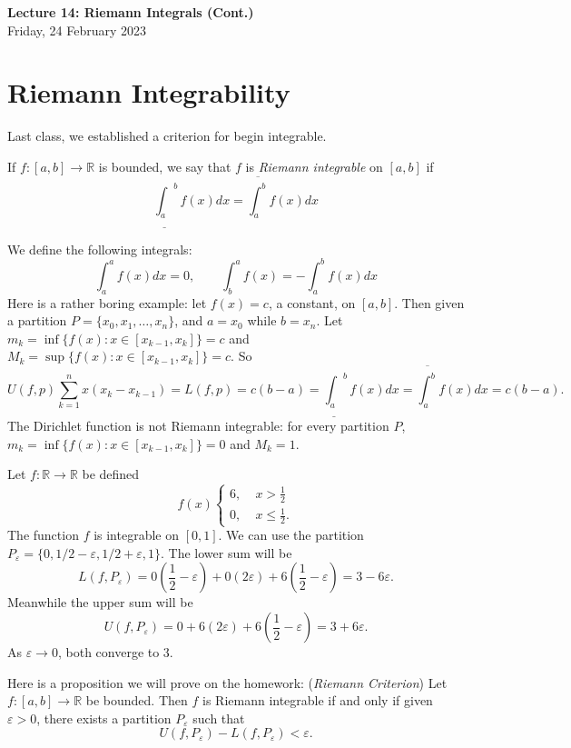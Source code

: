 \documentclass[11pt]{article}
\theoremstyle{definition}
\newcommand{\R}{\mathbb{R}}                      %
\begin{document}
\thispagestyle{empty}

\begin{center}
{\LARGE \bf Lecture 14: Riemann Integrals (Cont.)}\\
{\large Friday, 24 February 2023}\\

\end{center}

\section{Riemann Integrability}

Last class, we established a criterion for begin integrable.
\begin{mdframed}[backgroundcolor = blue!10]
\vspace{+0.2cm}
 If $f:[a,b]\to \R$ is bounded, we say that $f$ is \textit{Riemann integrable} on $[a,b]$ if 
$$
\underline{\int_a}^b f(x)dx =\overline{\int_a^b} f(x)dx
$$
\end{mdframed}
\note We define the following integrals:
$$
\int_a^a f(x)dx=0,\qquad\int_b^a f(x)=-\int_a^b f(x) dx
$$
\ex Here is a rather boring example: let $f(x) =c$, a constant, on $[a,b]$. Then given a partition $P=\{x_0,x_1,\dots,x_n\}$, and $a=x_0$ while $b=x_n$.  Let $m_k=\inf\{f(x):x\in[x_{k-1},x_k]\}=c$ and $M_k=\sup\{f(x):x\in[x_{k-1},x_k]\}=c$. So 
$$
U(f,p)\sum_{k=1}^n x(x_k-x_{k-1})=L(f,p)=c(b-a)=\underline{\int_a}^b f(x)dx =\overline{\int_a^b} f(x)dx=c(b-a).
$$
\ex The Dirichlet function is not Riemann integrable: for every partition $P$, $m_k=\inf\{f(x):x\in[x_{k-1},x_k]\}=0$ and $M_k=1$.

\ex Let $f:\R\to\R$ be defined
$$
f(x)\left\{\begin{aligned}  
6,\;&x>\frac{1}{2}\\
0,\;&x\leq\frac{1}{2}.
\end{aligned}\right.
$$
The function $f$ is integrable on $[0,1]$. We can use the partition $P_\varepsilon=\{0,1/2-\varepsilon,1/2+\varepsilon, 1\}$. The lower sum will be 
$$
L(f,P_\varepsilon)=0\left(\frac{1}{2}-\varepsilon\right)+0\left(2\varepsilon\right)+6\left(\frac{1}{2}-\varepsilon\right)=3-6\varepsilon.
$$
Meanwhile the upper sum will be
$$
U(f,P_\varepsilon)=0+6(2\varepsilon)+6\left(\frac{1}{2}-\varepsilon\right)=3+6\varepsilon.
$$
As $\varepsilon\to 0$, both converge to 3.

Here is a proposition we will prove on the homework:
\prop (\textit{Riemann Criterion}) Let $f:[a,b]\to \R$ be bounded. Then $f$ is Riemann integrable if and only if given $\varepsilon>0$, there exists a partition $P_\varepsilon$ such that 
$$
U(f,P_\varepsilon)-L(f,P_\varepsilon)<\varepsilon.
$$
\end{document}
